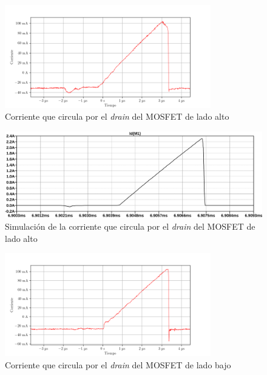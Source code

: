 \begin{figure}[H]
    \centering
    \includegraphics[width=0.8\textwidth]{images/capturas-osciloscopio/17-11-2022/20.png}
    \caption{Corriente que circula por el \textit{drain} del MOSFET de lado alto}
    \label{fig:osc:20}
\end{figure}

\begin{figure}[H]
    \centering
    \includegraphics[width=\textwidth]{images/sim/10.pdf}
    \caption{Simulación de la corriente que circula por el \textit{drain} del MOSFET de lado alto}
    \label{fig:sim:10}
\end{figure} 

\begin{figure}[H]
    \centering
    \includegraphics[width=0.8\textwidth]{images/capturas-osciloscopio/17-11-2022/22.png}
    \caption{Corriente que circula por el \textit{drain} del MOSFET de lado bajo}
    \label{fig:osc:22}
\end{figure}

